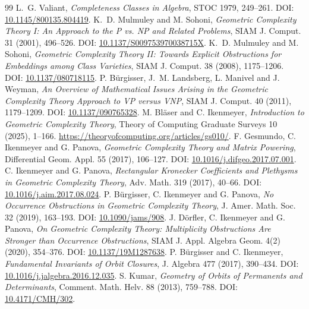 \documentclass[11pt]{article}
\theoremstyle{definition}
\theoremstyle{remark}
\begin{document}
\begin{thebibliography}{99}
 L.~G. Valiant, \emph{Completeness Classes in Algebra}, STOC 1979, 249--261. DOI: \href{https://doi.org/10.1145/800135.804419}{10.1145/800135.804419}.
 K.~D. Mulmuley and M. Sohoni, \emph{Geometric Complexity Theory I: An Approach to the P vs. NP and Related Problems}, SIAM J. Comput. 31 (2001), 496--526. DOI: \href{https://doi.org/10.1137/S009753970038715X}{10.1137/S009753970038715X}.
 K.~D. Mulmuley and M. Sohoni, \emph{Geometric Complexity Theory II: Towards Explicit Obstructions for Embeddings among Class Varieties}, SIAM J. Comput. 38 (2008), 1175--1206. DOI: \href{https://doi.org/10.1137/080718115}{10.1137/080718115}.
 P. B{\"u}rgisser, J.~M. Landsberg, L. Manivel and J. Weyman, \emph{An Overview of Mathematical Issues Arising in the Geometric Complexity Theory Approach to VP versus VNP}, SIAM J. Comput. 40 (2011), 1179--1209. DOI: \href{https://doi.org/10.1137/090765328}{10.1137/090765328}.
 M. Bl{\"a}ser and C. Ikenmeyer, \emph{Introduction to Geometric Complexity Theory}, Theory of Computing Graduate Surveys 10 (2025), 1--166. \url{https://theoryofcomputing.org/articles/gs010/}.
 F. Gesmundo, C. Ikenmeyer and G. Panova, \emph{Geometric Complexity Theory and Matrix Powering}, Differential Geom. Appl. 55 (2017), 106--127. DOI: \href{https://doi.org/10.1016/j.difgeo.2017.07.001}{10.1016/j.difgeo.2017.07.001}.
 C. Ikenmeyer and G. Panova, \emph{Rectangular Kronecker Coefficients and Plethysms in Geometric Complexity Theory}, Adv. Math. 319 (2017), 40--66. DOI: \href{https://doi.org/10.1016/j.aim.2017.08.024}{10.1016/j.aim.2017.08.024}.
 P. B{\"u}rgisser, C. Ikenmeyer and G. Panova, \emph{No Occurrence Obstructions in Geometric Complexity Theory}, J. Amer. Math. Soc. 32 (2019), 163--193. DOI: \href{https://doi.org/10.1090/jams/908}{10.1090/jams/908}.
 J. D{\"o}rfler, C. Ikenmeyer and G. Panova, \emph{On Geometric Complexity Theory: Multiplicity Obstructions Are Stronger than Occurrence Obstructions}, SIAM J. Appl. Algebra Geom. 4(2) (2020), 354--376. DOI: \href{https://doi.org/10.1137/19M1287638}{10.1137/19M1287638}.
 P. B{\"u}rgisser and C. Ikenmeyer, \emph{Fundamental Invariants of Orbit Closures}, J. Algebra 477 (2017), 390--434. DOI: \href{https://doi.org/10.1016/j.jalgebra.2016.12.035}{10.1016/j.jalgebra.2016.12.035}.
 S. Kumar, \emph{Geometry of Orbits of Permanents and Determinants}, Comment. Math. Helv. 88 (2013), 759--788. DOI: \href{https://doi.org/10.4171/CMH/302}{10.4171/CMH/302}.

\end{thebibliography}
\end{document}
